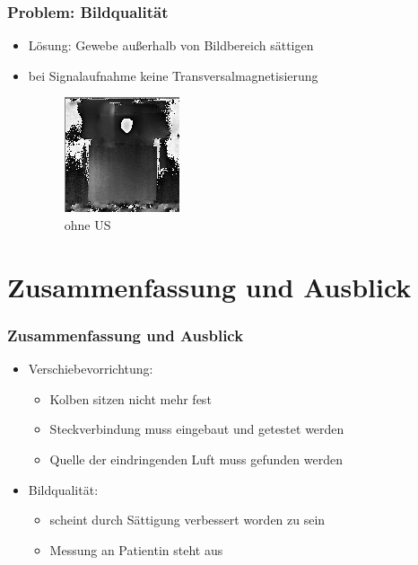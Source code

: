 \documentclass{beamer}
\begin{document}

    \begin{frame}
        \frametitle{Problem: Bildqualität}
        \begin{itemize}
            \item
                Lösung: Gewebe außerhalb von Bildbereich sättigen
            \item 
                bei Signalaufnahme keine Transversalmagnetisierung
                \begin{figure}
                    \centering
                    \includegraphics[width=.35\textwidth]{../Abbildungen/2014-12-11_37_1_phase_us_mensch_sat.png}
                    \caption*{ohne US}
                \end{figure}
        \end{itemize}
    \end{frame}

    \section{Zusammenfassung und Ausblick}


    \begin{frame}
        \frametitle{Zusammenfassung und Ausblick}
        \begin{itemize}
            \item 
                Verschiebevorrichtung:
                \begin{itemize}
                    \item 
                        Kolben sitzen nicht mehr fest
                    \item
                        Steckverbindung muss eingebaut und getestet werden
                    \item
                        Quelle der eindringenden Luft muss gefunden werden
                \end{itemize}
            \item
                Bildqualität:
                \begin{itemize}
                    \item 
                        scheint durch Sättigung verbessert worden zu sein
                    \item
                        Messung an Patientin steht aus
                \end{itemize}
        \end{itemize}
    \end{frame}
\end{document}
